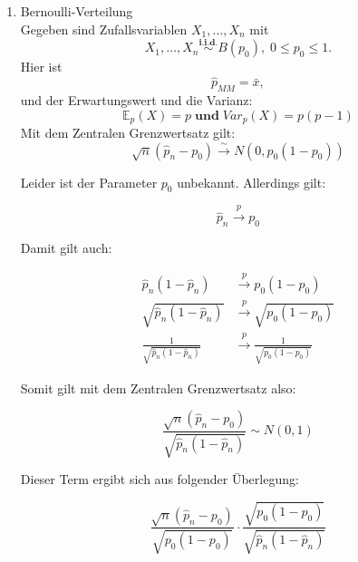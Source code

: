 \documentclass[10pt]{article}
\newcommand{\FZV}{X_1, \ldots, X_n} %
\newcommand{\EW}{\mathbb{E}} %
\newcommand{\KW}{\overset{p} \longrightarrow} %
\newcommand{\KV}{\overset{\sim} \longrightarrow} %
\begin{document}
	\begin{enumerate}[label = (\roman*)]
		\item Bernoulli-Verteilung\\
		Gegeben sind Zufallsvariablen $\FZV$ mit
		\begin{equation*}
			\FZV \overset{\textbf{i.i.d.}}{\sim} B(p_0), \; 0 \leq p_0 \leq 1.
		\end{equation*} 
		Hier ist
		\begin{equation*}
			\hat{p}_{MM} = \bar{x},
		\end{equation*}
		und der Erwartungswert und die Varianz:
		\begin{equation*}
			\EW_p(X)=p \; \textbf{und} \; 	Var_p(X) = p(p-1)
		\end{equation*}
		Mit dem Zentralen Grenzwertsatz gilt:
		\begin{equation*}
			\sqrt{n}(\hat{p}_n - p_0) \KV N(0,p_0(1-p_0))
		\end{equation*}
		
		Leider ist der Parameter $p_0$ unbekannt. Allerdings gilt:
		
		\begin{equation*}
			\hat{p}_n \KW p_0
		\end{equation*}
		
		Damit gilt auch:
		
		\begin{equation*}
			\begin{split}
				\hat{p}_n (1-\hat{p}_n) &\KW p_0(1-p_0) \\
				\sqrt{\hat{p}_n (1-\hat{p}_n)} &\KW \sqrt{p_0(1-p_0)} \\
				\frac{1}{\sqrt{\hat{p}_n (1-\hat{p}_n)}} &\KW \frac{1}{\sqrt{p_0(1-p_0)}}
			\end{split}
		\end{equation*}
		
		Somit gilt mit dem Zentralen Grenzwertsatz also:
		
		\begin{equation*}
			\frac{\sqrt{n} (\hat{p}_n - p_0)}{\sqrt{\hat{p}_n (1-\hat{p}_n)}} \sim N(0,1)
		\end{equation*}
		
		Dieser Term ergibt sich aus folgender Überlegung:
		
		\begin{equation*}
			\frac{\sqrt{n} (\hat{p}_n - p_0)}{\sqrt{p_0 (1-p_0)}} \cdot \frac{\sqrt{p_0(1-p_0)}}{\sqrt{\hat{p}_n (1-\hat{p}_n)}}
		\end{equation*}
		

\end{enumerate}
\end{document}
